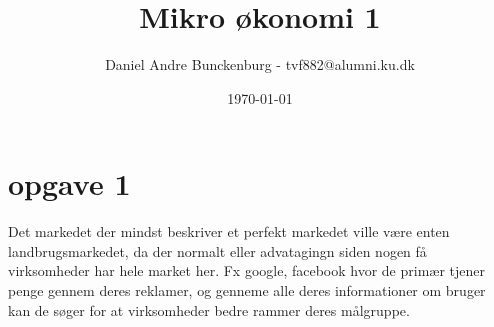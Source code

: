 \documentclass{article}
\title{Mikro økonomi 1}
\author{Daniel Andre Bunckenburg - tvf882@alumni.ku.dk}
\date{\today}
\begin{document}
\maketitle
\section{opgave 1}

Det markedet der mindst beskriver et perfekt markedet ville være enten landbrugsmarkedet, da der normalt 
eller advatagingn siden nogen få virksomheder har hele market her. Fx google, facebook hvor de primær tjener penge gennem deres reklamer, og genneme alle deres informationer om bruger kan de søger for at virksomheder bedre rammer deres målgruppe.
\end{document}

